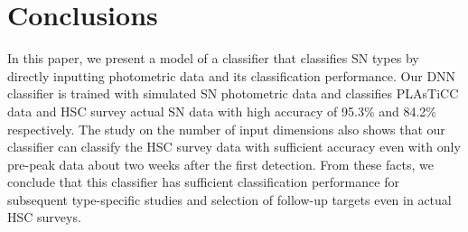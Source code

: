 \documentclass[useamsfonts]{pasj01}
\begin{document}
\section{Conclusions}
%
In this paper, we present a model of a classifier that classifies SN types by directly inputting photometric data and its classification performance.
Our DNN classifier is trained with simulated SN photometric data and classifies PLAsTiCC data and HSC survey actual SN data with high accuracy of 95.3\% and 84.2\% respectively.
The study on the number of input dimensions also shows that our classifier can classify the HSC survey data with sufficient accuracy even with only pre-peak data about two weeks after the first detection.
From these facts, we conclude that this classifier has sufficient classification performance for subsequent type-specific studies and selection of follow-up targets even in actual HSC surveys.
%
\end{document}
